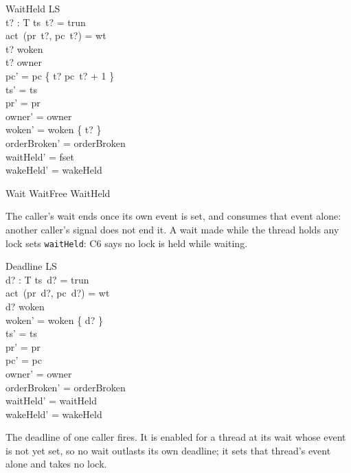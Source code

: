 \documentclass[a4paper,10pt,fleqn]{article}
\begin{document}
\begin{schema}{WaitHeld}
  \Delta LS \\
  t? : T
\where
  ts~t? = trun \\
  act~(pr~t?, pc~t?) = wt \\
  t? \in woken \\
  t? \in \ran owner \\
  pc' = pc \oplus \{ t? \mapsto pc~t? + 1 \} \\
  ts' = ts \\
  pr' = pr \\
  owner' = owner \\
  woken' = woken \setminus \{ t? \} \\
  orderBroken' = orderBroken \\
  waitHeld' = fset \\
  wakeHeld' = wakeHeld
\end{schema}

\begin{zed}
  Wait  WaitFree \lor WaitHeld
\end{zed}

The caller's wait ends once its own event is set, and consumes that event
alone: another caller's signal does not end it.  A wait made while the thread
holds any lock sets \texttt{waitHeld}: C6 says no lock is held while waiting.

\begin{schema}{Deadline}
  \Delta LS \\
  d? : T
\where
  ts~d? = trun \\
  act~(pr~d?, pc~d?) = wt \\
  d? \notin woken \\
  woken' = woken \cup \{ d? \} \\
  ts' = ts \\
  pr' = pr \\
  pc' = pc \\
  owner' = owner \\
  orderBroken' = orderBroken \\
  waitHeld' = waitHeld \\
  wakeHeld' = wakeHeld
\end{schema}

The deadline of one caller fires.  It is enabled for a thread at its wait
whose event is not yet set, so no wait outlasts its own deadline; it sets that
thread's event alone and takes no lock.
\end{document}
